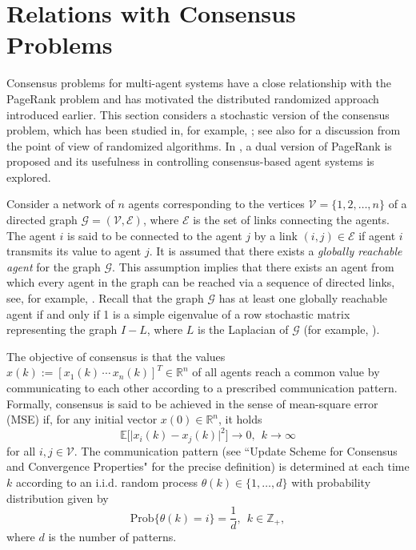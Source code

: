 \documentclass[11pt,draftcls,onecolumn]{IEEEtran}
\newcommand{\abs}[1]{\lvert#1\rvert}
\newcommand{\field}[1]{{\mathbb{#1}}}
\newcommand{\Prob}{\mathrm{Prob}}
\newcommand{\R}{\field{R}}
\newcommand{\Z}{\field{Z}}
\newcommand{\E}{\field{E}}
\begin{document}
\section*{Relations with Consensus Problems}

Consensus problems for multi-agent systems have a close relationship with
the PageRank problem and has motivated the distributed randomized approach 
introduced earlier. 
This section considers 
a stochastic version 
of the consensus problem, which has been studied
in, for example, \cite{BoyGhoPra:06,HatMes:05,TahJad:08,Wu:06};
see also \cite{TemIsh:07} for a discussion from the point of view of 
randomized algorithms. 
In \cite{TsuYam:08}, a dual version of PageRank is proposed and
its usefulness in controlling consensus-based agent systems is 
explored.

Consider a  network of $n$ agents corresponding to the vertices $\mathcal{V}=\{1,2,\ldots,n\}$ 
of a directed graph $\mathcal{G}=(\mathcal{V},\mathcal{E})$, where $\mathcal{E}$
is the set of links connecting the agents. The agent $i$ is said to be connected 
to the agent $j$ by a link $(i,j)\in\mathcal{E}$ if agent $i$ transmits its 
value to agent $j$. It is assumed that there exists a {\it globally reachable agent} 
for the  graph $\mathcal{G}$. This assumption implies that there exists an agent from which
every agent in the graph can be reached via a sequence of directed links, see, for example, 
\cite{BulCorMar:09,LinFraMag:05,RenBea:05}. Recall that the graph 
$\mathcal{G}$ has at least one globally reachable agent if and only if 1 is 
a simple eigenvalue of a row stochastic matrix representing the graph $I - L$, 
where $L$ is the Laplacian of $\mathcal{G}$ (for example, \cite{BulCorMar:09}).

The objective of consensus is that the values 
$x(k):= [x_1(k) \,\cdots\, x_n(k)]^T\in\R^n$ of all agents reach a common value 
by communicating to each other according to a prescribed communication pattern. 
Formally, consensus is said to be achieved in the sense of mean-square error (MSE) if, 
for any initial vector $x(0)\in\R^n$, it holds
\begin{equation}
\E\bigl[\abs{x_i(k)-x_j(k)}^2\bigr] \rightarrow 0,~~k\rightarrow\infty
\nonumber
\end{equation}
for all $i,j\in\mathcal{V}$.
The communication pattern (see ``Update Scheme for Consensus and Convergence Properties" 
for the precise definition) 
is determined at each time $k$ according to an i.i.d. random process
$\theta(k) \in\{1,\ldots,d\}$ with probability distribution given by 
$$
\Prob\{\theta(k)=i\} = \frac{1}{d},~~k\in\Z_+, 
$$
where $d$ is the number of patterns.
\end{document}
